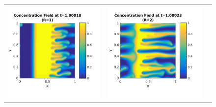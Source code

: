 \documentclass{article}
\begin{document}
\begin{enumerate}
\begin{figure}[!ht]
\begin{tabular}{c c c}
\includegraphics[scale=0.5]{conc10_100.png} &
\includegraphics[scale=0.5]{conc20_100.png} &

\end{tabular}
\end{figure}
\end{enumerate}
\end{document}
